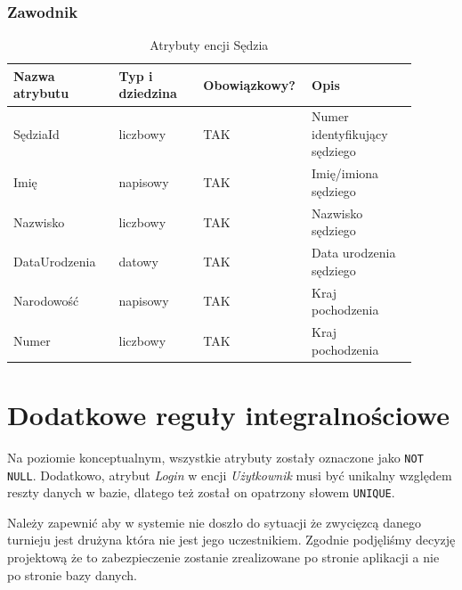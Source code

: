 \documentclass{mwrep}
\begin{document}
\subsubsection{Zawodnik}
\begin{table}[H]
	\begin{tabular}{|p{0.25\linewidth}|p{0.2\linewidth}|p{0.2\linewidth}|p{0.25\linewidth}|}
	\hline
	Nazwa atrybutu & Typ i dziedzina & Obowiązkowy? & Opis                                                           \\ \hline
	SędziaId   & liczbowy                            & TAK                              & Numer identyfikujący sędziego                                                   \\ \hline
	Imię         & napisowy                           & TAK                              & Imię/imiona sędziego        \\ \hline
	Nazwisko	   & liczbowy							& TAK								& Nazwisko sędziego \\  \hline
	DataUrodzenia          & datowy                           & TAK                              & Data urodzenia sędziego              \\ \hline
	Narodowość           & napisowy                            & TAK                              & Kraj pochodzenia   \\ \hline
	Numer           & liczbowy                            & TAK                              & Kraj pochodzenia   \\ \hline
	\end{tabular}
	\caption{Atrybuty encji Sędzia}
\end{table}

\section{Dodatkowe reguły integralnościowe}

Na poziomie konceptualnym, wszystkie atrybuty zostały oznaczone jako \texttt{NOT NULL}. Dodatkowo, atrybut \emph{Login} w encji
\emph{Użytkownik} musi być unikalny względem reszty danych w bazie, dlatego też został on opatrzony słowem \texttt{UNIQUE}.

Należy zapewnić aby w systemie nie doszło do sytuacji że zwycięzcą danego turnieju jest drużyna która nie jest jego uczestnikiem.
Zgodnie podjęliśmy decyzję projektową że to zabezpieczenie zostanie zrealizowane po stronie aplikacji a nie po stronie bazy danych.

\vspace{1cm}
\end{document}
